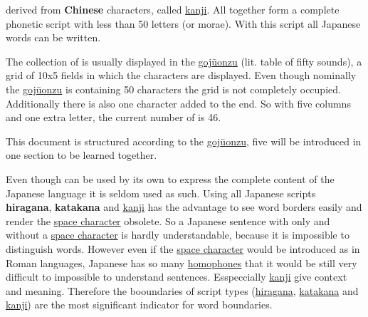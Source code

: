 \jscript{} derived from \textbf{Chinese} characters, called
\hyperref[sec:Kanji]{kanji}. All \jtopic{} together form a complete phonetic
script with less than 50 letters (or morae). With this script all Japanese
words can be written.


The collection of \textbf{\jtopic} is usually displayed in the
\hyperref[sec:Gojuonzu]{gojūonzu} (lit. table of fifty sounds), a grid of 10x5
fields in which the characters are displayed. Even though nominally the
\hyperref[sec:Gojuonzu]{gojūonzu} is containing 50 characters the grid is not
completely occupied. Additionally there is also one character added to the end.
So with five columns and one extra letter, the current number of
\textbf{\jtopic} is 46. %
%
%



This document is structured according to the \hyperref[sec:Gojuonzu]{gojūonzu},
five \textbf{\jtopic} will be introduced in one section to be learned together.


Even though \textbf{\jtopic} can be used by its own to express the complete
content of the Japanese language it is seldom used as such. Using all Japanese
scripts \textbf{hiragana}, \textbf{katakana} and \hyperref[sec:Kanji]{kanji}
has the advantage to see word borders easily and render the
\hyperref[sec:SpaceCharacter]{space character} obsolete. So a Japanese
\textbf{\jtopic} sentence with \textbf{\jtopic} only and without a
\hyperref[sec:SpaceCharacter]{space character} is hardly understandable,
because it is impossible to distinguish words. However even if the
\hyperref[sec:SpaceCharacter]{space character} would be introduced as in Roman
languages, Japanese has so many \hyperref[sec:Homophone]{homophones} that it
would be still very difficult to impossible to understand sentences.
Esspeccially \hyperref[sec:Kanji]{kanji} give context and meaning. Therefore
the booundaries of script types (\hyperref[sec:Hiragana]{hiragana},
\hyperref[sec:Katakana]{katakana} and \hyperref[sec:Kanji]{kanji}) are
the most significant indicator for word boundaries.

